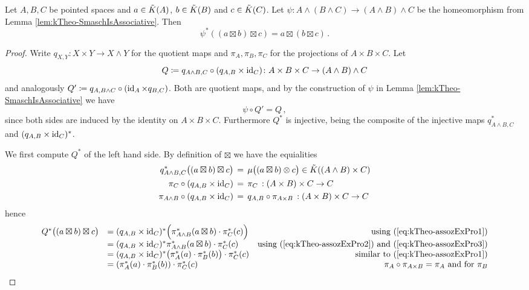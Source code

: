 \begin{proposition} \label{prop:kTheo-associativityExternalProduct}
	Let $A,B,C$ be pointed spaces and $a\in \tilde{K}(A)$,
	 $b\in \tilde{K}(B)$ and 
	 $c\in \tilde{K}(C)$. 
	Let $\psi: A\wedge (B\wedge C)\to (A\wedge B)\wedge C$ be the homeomorphism from Lemma \ref{lem:kTheo-SmaschIsAssociative}. Then
	\begin{equation*}
		\psi^*((a\boxtimes b)\boxtimes c)=a\boxtimes (b\boxtimes c) \,.
	\end{equation*}
\end{proposition}
\begin{proof}
	Write $q_{X,Y}\colon X\times Y\to X\wedge Y$ for the quotient maps and
	$\pi_A,\pi_B,\pi_C$ for the projections of $A\times B\times C$. Let
	\begin{equation*}
		Q\coloneq q_{A\wedge B,C}\circ (q_{A,B}\times \operatorname{\mathrm{id}}_C)\colon A\times B\times C\to (A\wedge B)\wedge C
	\end{equation*}
	and analogously $Q'\coloneq q_{A,B\wedge C}\circ(\operatorname{\mathrm{id}}_A\times q_{B,C})$. Both are
	quotient maps, and by the construction of $\psi$ in Lemma
	\ref{lem:kTheo-SmaschIsAssociative} we have
	\begin{equation}\label{eq:kTheo-assocQuotients}
		\psi\circ Q'=Q\,,
	\end{equation}
	since both sides are induced by the identity on $A\times B\times C$.
	Furthermore $Q^*$ is injective, being the composite of the injective maps
	$q_{A\wedge B,C}^*$ and $(q_{A,B}\times\operatorname{\mathrm{id}}_C)^*$.

	We first compute $Q^*$ of the left hand side. By definition of $\boxtimes$ we
	have the equialities 
	\begin{align}
		q_{A\wedge B,C}^{*}\bigl((a\boxtimes b)\boxtimes c\bigr)
	\,&=\,\mu\bigl((a\boxtimes b)\otimes c\bigr)\in \tilde{K}((A\wedge B)\times C)\label{eq:kTheo-assozExPro1}\\
		\pi_C\circ (q_{A,B}\times \operatorname{\mathrm{id}}_C)\,&=\,\pi_C\,:(A\times B )\times C \to C \label{eq:kTheo-assozExPro2}\\
\pi_{A\wedge B}\circ (q_{A,B}\times \operatorname{\mathrm{id}}_C)\,&=\,q_{A,B}\circ \pi_{A\times B}\,:(A\times B )\times C \to C \label{eq:kTheo-assozExPro3}
	\end{align} hence
	\begin{equation*}
		\begin{array}{llr}
			Q^{*}\bigl((a\boxtimes b)\boxtimes c\bigr)
		&=(q_{A,B}\times\operatorname{\mathrm{id}}_C)^{*}\Bigl(\pi_{A\wedge B}^{*}(a\boxtimes b)\cdot \pi_C^{*}(c)\Bigr)& \text{using (\ref{eq:kTheo-assozExPro1})}\\
		&=(q_{A,B}\times\operatorname{\mathrm{id}}_C)^{*}\pi_{A\wedge B}^{*}(a\boxtimes b)\cdot \pi_C^{*}(c)& \text{using (\ref{eq:kTheo-assozExPro2}) and (\ref{eq:kTheo-assozExPro3})}\\
		&=(q_{A,B}\times\operatorname{\mathrm{id}}_C)^{*}\big(\pi_A^*(a)\cdot \pi_B^*(b)\big)\cdot \pi_C^{*}(c)&\text{ similar to (\ref{eq:kTheo-assozExPro1})}\\
		&=(\pi_A^{*}(a)\cdot\pi_B^{*}(b))\cdot\pi_C^{*}(c)& \pi_A\circ \pi_{A\times B}=\pi_A \text{ and for $\pi_B$}
		\end{array}
	\end{equation*}
	

\end{proof}
